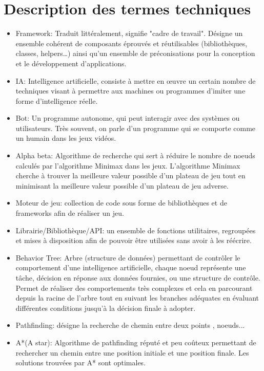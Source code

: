 \documentclass[french]{article}
\begin{document}
\newpage
\section{Description des termes techniques}

\begin{itemize}
    \item Framework: Traduit littéralement, signifie "cadre de travail". Désigne un ensemble cohérent de composants éprouvés et réutilisables (bibliothèques, classes, helpers…) ainsi qu'un ensemble de préconisations pour la conception et le développement d'applications.
    \newline
    \item IA: Intelligence artificielle, consiste à mettre en œuvre un certain nombre de techniques visant à permettre aux machines ou programmes d'imiter une forme d'intelligence réelle.
    \newline
    \item Bot: Un programme autonome, qui peut interagir avec des systèmes ou utilisateurs. Très souvent, on parle d'un programme qui se comporte comme un humain dans les jeux vidéos.
    \newline    
    \item Alpha beta: Algorithme de recherche qui sert à réduire le nombre de noeuds calculés par l'algorithme Minimax dans les jeux. L'algorithme Minimax cherche à trouver la meilleure valeur possible d'un plateau de jeu tout en minimisant la meilleure valeur possible d'un plateau de jeu adverse.\newline


    \item Moteur de jeu: collection de code sous forme de bibliothèques et de frameworks afin de réaliser un jeu.
    \newline
    \item Librairie/Bibliothèque/API: un ensemble de fonctions utilitaires, regroupées et mises à disposition afin de pouvoir être utilisées sans avoir à les réécrire.
    \newline
    \item Behavior Tree: Arbre (structure de données) permettant de contrôler le comportement d'une intelligence artificielle, chaque noeud représente une tâche, décision en réponse aux données fournies, ou une structure de contrôle. Permet de réaliser des comportements très complexes et cela en parcourant depuis la racine de l'arbre tout en suivant les branches adéquates en évaluant différentes conditions jusqu'à la décision finale à adopter.
    \newline
    \item Pathfinding: désigne la recherche de chemin entre deux points , noeuds...
    \newline
    \item A*(A star): Algorithme de pathfinding réputé et peu coûteux permettant de rechercher un chemin entre une position initiale et une position finale. Les solutions trouvées par A* sont optimales.
    \newline
    

\end{itemize}
\end{document}
